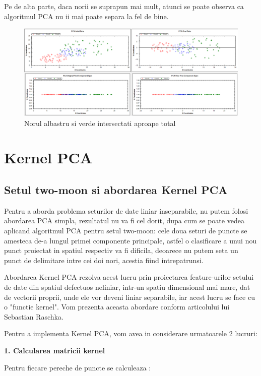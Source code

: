 \documentclass[12pt,oneside]{article}
\begin{document}
Pe de alta parte, daca norii se suprapun mai mult, atunci se poate observa ca algoritmul PCA nu ii mai poate separa la fel de bine.

\begin{figure}[H]
\centering
\caption{Norul albastru si verde intersectati aproape total}
\includegraphics[width=\linewidth]{threecloud3}
\end{figure}

\newpage
\section{Kernel PCA}

\subsection{Setul two-moon si abordarea Kernel PCA}
Pentru a aborda problema seturilor de date liniar inseparabile, nu putem folosi abordarea PCA simpla, rezultatul nu va fi cel dorit, dupa cum se poate vedea aplicand algoritmul PCA pentru setul two-moon: cele doua seturi de puncte se amesteca de-a lungul primei componente principale, astfel o clasificare a unui nou punct proiectat in spatiul respectiv va fi dificila, deoarece nu putem seta un punct de delimitare intre cei doi nori, acestia fiind intrepatrunsi. 

Abordarea Kernel PCA rezolva acest lucru prin proiectarea feature-urilor setului de date din spatiul defectuos neliniar, intr-un spatiu dimensional mai mare, dat de vectorii proprii, unde ele vor deveni liniar separabile, iar acest lucru se face cu o "functie kernel". Vom prezenta aceasta abordare conform articolului lui Sebastian Raschka.\cite{kernel_pca}

Pentru a implementa Kernel PCA, vom avea in considerare urmatoarele 2 lucruri:

\textbf{1. Calcularea matricii kernel} 

Pentru fiecare pereche de puncte se calculeaza :
\end{document}
